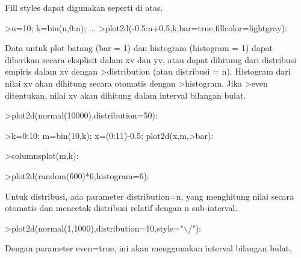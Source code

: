 \documentclass[a4paper,10pt]{article}
\begin{document}
\begin{eulernotebook}
\begin{eulercomment}
\begin{eulercomment}
\begin{eulercomment}
Fill styles dapat digunakan seperti di atas.
\end{eulercomment}
\begin{eulerprompt}
>n=10; k=bin(n,0:n); ...
>plot2d(-0.5:n+0.5,k,bar=true,fillcolor=lightgray):
\end{eulerprompt}
\begin{eulercomment}
Data untuk plot batang (bar = 1) dan histogram (histogram = 1) dapat
diberikan secara eksplisit dalam xv dan yv, atau dapat dihitung dari
distribusi empiris dalam xv dengan \textgreater{}distribution (atau distribusi =
n). Histogram dari nilai xv akan dihitung secara otomatis dengan
\textgreater{}histogram. Jika \textgreater{}even ditentukan, nilai xv akan dihitung dalam
interval bilangan bulat.
\end{eulercomment}
\begin{eulerprompt}
>plot2d(normal(10000),distribution=50):
\end{eulerprompt}
\begin{eulerprompt}
>k=0:10; m=bin(10,k); x=(0:11)-0.5; plot2d(x,m,>bar):
\end{eulerprompt}
\begin{eulerprompt}
>columnsplot(m,k):
\end{eulerprompt}
\begin{eulerprompt}
>plot2d(random(600)*6,histogram=6):
\end{eulerprompt}
\begin{eulercomment}
Untuk distribusi, ada parameter distribution=n, yang menghitung nilai
secara otomatis dan mencetak distribusi relatif dengan n sub-interval.
\end{eulercomment}
\begin{eulerprompt}
>plot2d(normal(1,1000),distribution=10,style="\(\backslash\)/"):
\end{eulerprompt}
\begin{eulercomment}
Dengan parameter even=true, ini akan menggunakan interval bilangan
bulat.
\end{eulercomment}
\begin{eulerprompt}

\end{eulerprompt}
\end{eulercomment}
\end{eulercomment}
\end{eulernotebook}
\end{document}

